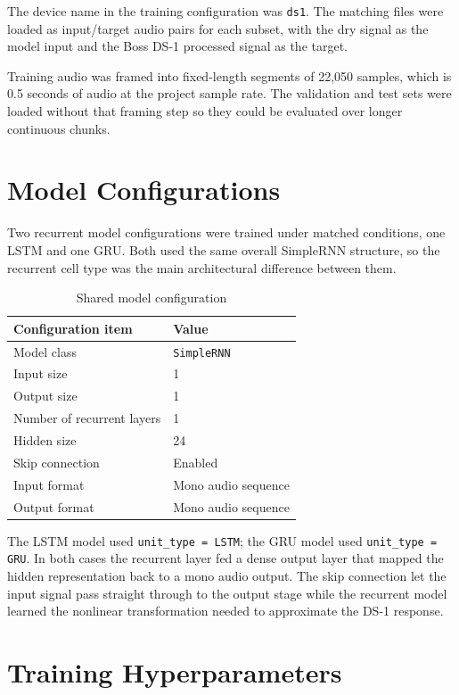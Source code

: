 The device name in the training configuration was \texttt{ds1}. The matching files were loaded as input/target audio pairs for each subset, with the dry signal as the model input and the Boss DS-1 processed signal as the target.

Training audio was framed into fixed-length segments of 22,050 samples, which is 0.5 seconds of audio at the project sample rate. The validation and test sets were loaded without that framing step so they could be evaluated over longer continuous chunks.

\section{Model Configurations}

Two recurrent model configurations were trained under matched conditions, one LSTM and one GRU. Both used the same overall SimpleRNN structure, so the recurrent cell type was the main architectural difference between them.

\begin{table}[htbp]
  \centering
  \caption{Shared model configuration}
  \label{tab:appendix-shared-model-config}
  \begin{tabular}{ll}
    \toprule
    Configuration item & Value \\
    \midrule
    Model class & \texttt{SimpleRNN} \\
    Input size & 1 \\
    Output size & 1 \\
    Number of recurrent layers & 1 \\
    Hidden size & 24 \\
    Skip connection & Enabled \\
    Input format & Mono audio sequence \\
    Output format & Mono audio sequence \\
    \bottomrule
  \end{tabular}
\end{table}

The LSTM model used \texttt{unit\_type = LSTM}; the GRU model used \texttt{unit\_type = GRU}. In both cases the recurrent layer fed a dense output layer that mapped the hidden representation back to a mono audio output. The skip connection let the input signal pass straight through to the output stage while the recurrent model learned the nonlinear transformation needed to approximate the DS-1 response.

\section{Training Hyperparameters}

